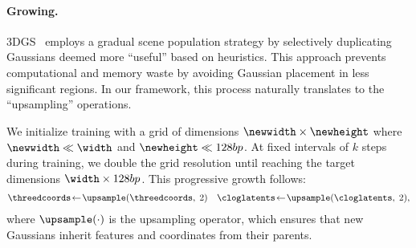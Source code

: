 
    \paragraph{Growing.}
      3DGS~\cite{kerbl20233d} employs a gradual scene population strategy by selectively duplicating Gaussians deemed more ``useful'' based on heuristics.
      This approach prevents computational and memory waste by avoiding
      Gaussian placement in less significant regions.
      In our framework, this process naturally translates to the
      ``upsampling'' operations.

      We initialize training with a grid of dimensions $\newwidth \times
      \newheight$ where $\newwidth \ll \width$ and $\newheight \ll \height$.
      At fixed intervals of $k$ steps during training, we double the grid
      resolution until reaching the target dimensions $\width \times \height$.
      This progressive growth follows:
      \begin{equation}
        \label{eq:clog-upsampling}
        \begin{aligned}
          \threedcoords\!\leftarrow\!\upsample(\threedcoords,\;2) \quad \cloglatents\!\leftarrow\!\upsample(\cloglatents,\; 2),
        \end{aligned}
      \end{equation}
      where $\upsample(\cdot)$ is the upsampling operator, which ensures that new Gaussians inherit features and coordinates from their parents.

